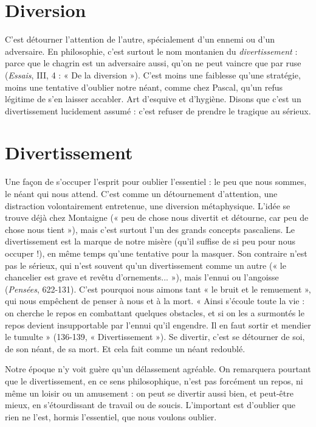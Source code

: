 \section{Diversion}
C'est détourner l'attention de l’autre, spécialement d’un
ennemi ou d’un adversaire. En philosophie, c’est surtout le
nom montanien du {\it divertissement} : parce que le chagrin est un adversaire aussi,
qu'on ne peut vaincre que par ruse ({\it Essais}, III, 4 : « De la diversion »). C’est
moins une faiblesse qu’une stratégie, moins une tentative d’oublier notre néant,
comme chez Pascal, qu’un refus légitime de s’en laisser accabler. Art d’esquive
et d'hygiène. Disons que c’est un divertissement lucidement assumé : c’est
refuser de prendre le tragique au sérieux.

\section{Divertissement}
Une façon de s’occuper l'esprit pour oublier l’essentiel :
le peu que nous sommes, le néant qui nous
attend. C’est comme un détournement d’attention, une distraction volontairement
entretenue, une diversion métaphysique. L’idée se trouve déjà chez Montaigne
(« peu de chose nous divertit et détourne, car peu de chose nous tient »),
mais c’est surtout l’un des grands concepts pascaliens. Le divertissement est la
marque de notre misère (qu’il suffise de si peu pour nous occuper !), en même
temps qu’une tentative pour la masquer. Son contraire n’est pas le sérieux, qui
n’est souvent qu’un divertissement comme un autre (« le chancelier est grave et
revêtu d’ornements... »), mais l’ennui ou l’angoisse ({\it Pensées}, 622-131). C’est
pourquoi nous aimons tant « le bruit et le remuement », qui nous empêchent
de penser à nous et à la mort. « Ainsi s’écoule toute la vie : on cherche le repos
en combattant quelques obstacles, et si on les a surmontés le repos devient
insupportable par l'ennui qu’il engendre. Il en faut sortir et mendier le
tumulte » (136-139, « Divertissement »). Se divertir, c’est se détourner de soi,
de son néant, de sa mort. Et cela fait comme un néant redoublé.

Notre époque n’y voit guère qu’un délassement agréable. On remarquera
pourtant que le divertissement, en ce sens philosophique, n’est pas forcément
un repos, ni même un loisir ou un amusement : on peut se divertir aussi bien,
et peut-être mieux, en s’étourdissant de travail ou de soucis. L'important est
d'oublier que rien ne l’est, hormis l'essentiel, que nous voulons oublier.

